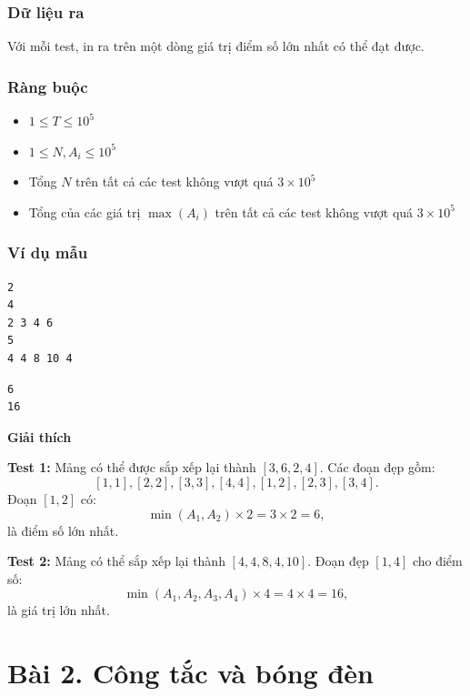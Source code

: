 \subsubsection*{Dữ liệu ra}

Với mỗi test, in ra trên một dòng giá trị điểm số lớn nhất có thể đạt được.

\subsubsection*{Ràng buộc}

\begin{itemize}
    \item $1 \le T \le 10^5$
    \item $1 \le N, A_i \le 10^5$
    \item Tổng $N$ trên tất cả các test không vượt quá $3 \times 10^5$
    \item Tổng của các giá trị $\max(A_i)$ trên tất cả các test không vượt quá $3 \times 10^5$
\end{itemize}

\subsubsection*{Ví dụ mẫu}

\begin{tcolorbox}[title=Input]
\begin{verbatim}
2
4
2 3 4 6
5
4 4 8 10 4
\end{verbatim}
\end{tcolorbox}

\begin{tcolorbox}[title=Output]
\begin{verbatim}
6
16
\end{verbatim}
\end{tcolorbox}

\textbf{Giải thích}

\textbf{Test 1:}  
Mảng có thể được sắp xếp lại thành $[3, 6, 2, 4]$.  
Các đoạn đẹp gồm:
\[
[1,1], [2,2], [3,3], [4,4], [1,2], [2,3], [3,4].
\]
Đoạn $[1,2]$ có:
\[
\min(A_1, A_2) \times 2 = 3 \times 2 = 6,
\]
là điểm số lớn nhất.

\textbf{Test 2:}  
Mảng có thể sắp xếp lại thành $[4, 4, 8, 4, 10]$.  
Đoạn đẹp $[1,4]$ cho điểm số:
\[
\min(A_1, A_2, A_3, A_4) \times 4 = 4 \times 4 = 16,
\]
là giá trị lớn nhất.

\newpage

\section*{Bài 2. Công tắc và bóng đèn}

